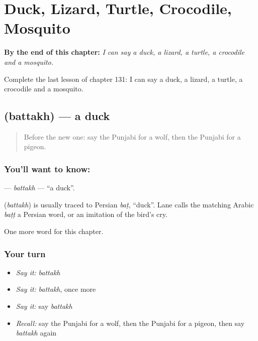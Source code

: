 
\chapter{Duck, Lizard, Turtle, Crocodile, Mosquito}
\label{ch:pa-duck-lizard-turtle-crocodile-mosquito}

\begin{chapteropening}
\textbf{By the end of this chapter:} \emph{I can say a duck, a lizard, a turtle, a crocodile and a mosquito.}

Complete the last lesson of chapter 131: I can say a duck, a lizard, a turtle, a crocodile and a mosquito.
\end{chapteropening}

\section[\texorpdfstring{\pa{ਬੱਤਖ਼} (battakh)}{ਬੱਤਖ਼ (battakh)}]{ (battakh) — a duck}

\label{lesson:PA-C131-battakh}



\begin{quote}
Before the new one: say the Punjabi for a wolf, then the Punjabi for a pigeon.
\end{quote}

\subsection*{You'll want to know: }
\textbf{} — \emph{battakh} — \textquotedblleft{}a duck\textquotedblright{}.

\begin{cousinweb}
\textbf{} (\emph{battakh}) is usually traced to Persian \emph{baṭ}, \textquotedblleft{}duck\textquotedblright{}. Lane calls the matching Arabic \emph{baṭṭ} a Persian word, or an imitation of the bird's cry.
\end{cousinweb}

\begin{grammarlens}[title={What you've built}]
One more word for this chapter.
\end{grammarlens}

\subsection*{Your turn}
\begin{itemize}
\raggedright
  \item \emph{Say it:} \emph{battakh}
  \item \emph{Say it:} \emph{battakh}, once more
  \item \emph{Say it:} say \emph{battakh}
  \item \emph{Recall:} say the Punjabi for a wolf, then the Punjabi for a pigeon, then say \emph{battakh} again
\end{itemize}

